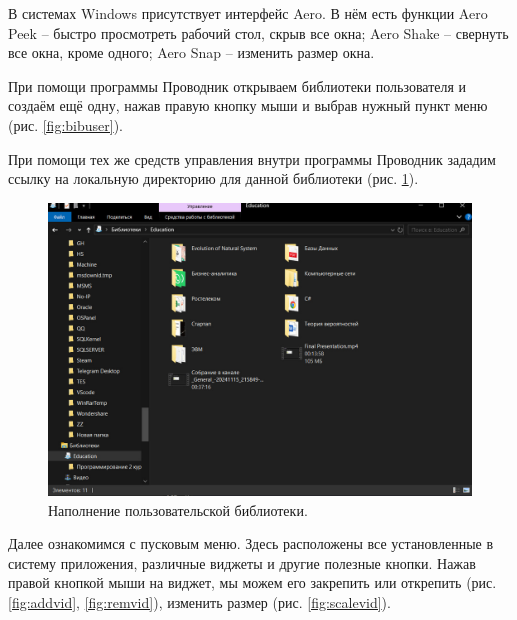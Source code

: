 В системах Windows присутствует интерфейс Aero. В нём есть функции Aero Peek – быстро просмотреть рабочий стол, скрыв все окна; Aero Shake – свернуть все окна, кроме одного; Aero Snap – изменить размер окна.

При помощи программы Проводник открываем библиотеки пользователя и создаём ещё одну, нажав правую кнопку мыши и выбрав нужный пункт меню (рис. \ref{fig:bibuser}).

При помощи тех же средств управления внутри программы Проводник зададим ссылку на локальную директорию для данной библиотеки (рис. \ref{fig:bibinside}).
\begin{figure}[h!]
    \centering
    \includegraphics[width=0.5\linewidth]{Pic/lab1/photo_2025-05-21_08-15-02.jpg}
    \caption{Наполнение пользовательской библиотеки.}
    \label{fig:bibinside}
\end{figure}

Далее ознакомимся с пусковым меню. Здесь расположены все установленные в систему приложения, различные виджеты и другие полезные кнопки. Нажав правой кнопкой мыши на виджет, мы можем его закрепить или открепить (рис. \ref{fig:addvid}, \ref{fig:remvid}), изменить размер (рис. \ref{fig:scalevid}).

